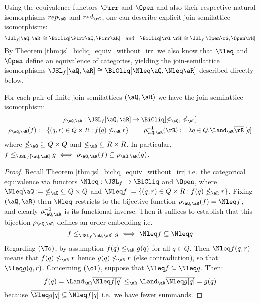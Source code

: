 \documentclass{article}
\begin{document}
\begin{note}
\item

Using the equivalence functors $\Pirr$ and $\Open$ and also their respective natural isomorphisms $rep_\aQ$ and $red_\rG$, one can describe explicit join-semilattice isomorphisms:
\[
\JSL_f[\aQ,\aR] \cong \BiCliq[\Pirr\aQ,\Pirr\aR]
\quad\text{and}\quad
\BiCliq[\rG,\rH] \cong \JSL_f[\Open\rG,\Open\rH]
\]
By Theorem \ref{thm:jsl_bicliq_equiv_without_irr} we also know that $\Nleq$ and $\Open$ define an equivalence of categories, yielding the join-semilattice isomorphisms $\JSL_f[\aQ,\aR] \cong \BiCliq[\Nleq\aQ,\Nleq\aR]$ described directly below. \endbox
\end{note}

\smallskip

\begin{lemma}
\label{lem:jsl_bicliq_hom_spec_iso}
For each pair of finite join-semilattices $(\aQ,\aR)$ we have the join-semilattice isomorphism:
\[
\begin{tabular}{c}
$\rho_{\aQ,\aR} : \JSL_f[\aQ,\aR] \to \BiCliq[\nleq_\aQ , \, \nleq_\aR ]$
\\[1ex]
$\rho_{\aQ,\aR} (f) := \{ (q,r) \in Q \times R : f(q) \nleq_\aR r \}$
\qquad
$\rho_{\aQ,\aR}^{\bf-1}(\rR) := \lambda q \in Q. \Land_\aR \overline{\rR}\,[q]$
\end{tabular}
\]
where $\nleq_\aQ \; \subseteq Q \times Q$ and $\nleq_\aR \; \subseteq R \times R$. In particular, $f \leq_{\JSL_f[\aQ,\aR]} g \iff \rho_{\aQ,\aR}(f) \subseteq \rho_{\aQ,\aR}(g)$.
\end{lemma}

\begin{proof}
Recall Theorem \ref{thm:jsl_bicliq_equiv_without_irr} i.e.\ the categorical equivalence via functors $\Nleq : \JSL_f \to \BiCliq$ and $\Open$, where $\Nleq \aQ := \; \nleq_\aQ \; \subseteq Q \times Q$ and $\Nleq f := \{ (q,r) \in Q \times R : f(q) \nleq_\aR r \}$. Fixing $(\aQ,\aR)$ then $\Nleq$ restricts to the bijective function $\rho_{\aQ,\aR}(f) = \Nleq f$, and clearly $\rho_{\aQ,\aR}^{\bf-1}$ is its functional inverse. Then it suffices to establish that this bijection $\rho_{\aQ,\aR}$ defines an order-embedding i.e.\
\[
f \leq_{\JSL_f[\aQ,\aR]} g
\iff
\Nleq f \subseteq \Nleq g
\]
Regarding $(\To)$, by assumption $f(q) \leq_\aR g(q)$ for all $q \in Q$. Then $\Nleq f(q,r)$ means that $f(q) \nleq_\aR r$ hence $g(q) \nleq_\aR r$ (else contradiction), so that $\Nleq g(q,r)$. Concerning $(\oT)$, suppose that $\Nleq f \subseteq \Nleq q$. Then:
\[
f(q) = \Land_\aR \overline{\Nleq f[q]} \leq_\aR \Land_\aR \overline{\Nleq g[q]} = g(q)
\]
because $\overline{\Nleq g[q]} \subseteq \overline{\Nleq f[q]}$ i.e.\ we have fewer summands.
\end{proof}
\end{document}
